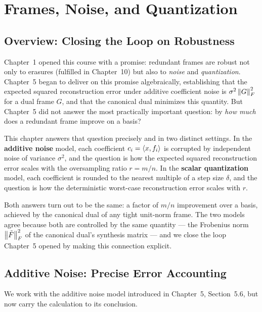 \chapter{Frames, Noise, and Quantization}
\label{ch:noise-quantization}

\section{Overview: Closing the Loop on Robustness}
\label{sec:ch11-overview}

Chapter~1 opened this course with a promise: redundant frames are robust
not only to erasures (fulfilled in Chapter~10) but also to
\emph{noise} and \emph{quantization}. Chapter~5 began to deliver on
this promise algebraically, establishing that the expected squared
reconstruction error under additive coefficient noise is
$\sigma^2\left\| G \right\|_F^2$ for a dual frame $G$, and that the canonical
dual minimizes this quantity. But Chapter~5 did not answer the most
practically important question: by \emph{how much} does a redundant
frame improve on a basis?

This chapter answers that question precisely and in two distinct
settings. In the \textbf{additive noise} model, each coefficient
$c_i=\left\langle x, f_i \right\rangle$ is corrupted by independent noise of variance
$\sigma^2$, and the question is how the expected squared
reconstruction error scales with the oversampling ratio $r=m/n$. In
the \textbf{scalar quantization} model, each coefficient is rounded to
the nearest multiple of a step size $\delta$, and the question is how
the deterministic worst-case reconstruction error scales with $r$.

Both answers turn out to be the same: a factor of $m/n$ improvement
over a basis, achieved by the canonical dual of any tight unit-norm
frame. The two models agree because both are controlled by the same
quantity --- the Frobenius norm $\left\| \tilde F \right\|_F^2$ of the canonical
dual's synthesis matrix --- and we close the loop Chapter~5 opened by
making this connection explicit.

\section{Additive Noise: Precise Error Accounting}
\label{sec:additive-noise}

We work with the additive noise model introduced in Chapter~5,
Section~5.6, but now carry the calculation to its conclusion.

